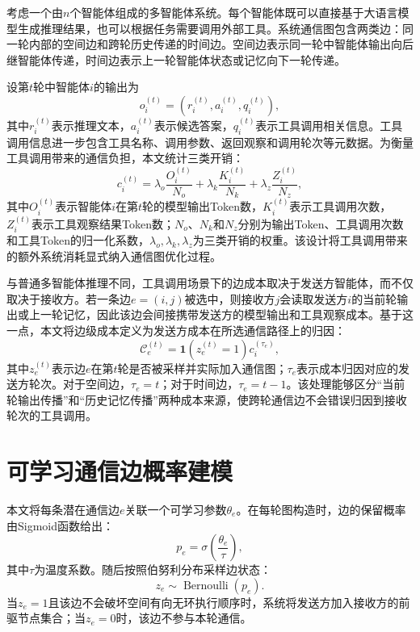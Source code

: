 考虑一个由$n$个智能体组成的多智能体系统。每个智能体既可以直接基于大语言模型生成推理结果，也可以根据任务需要调用外部工具。系统通信图包含两类边：同一轮内部的空间边和跨轮历史传递的时间边。空间边表示同一轮中智能体输出向后继智能体传递，时间边表示上一轮智能体状态或记忆向下一轮传递。

设第$t$轮中智能体$i$的输出为
\begin{equation}
  o_i^{(t)} = (r_i^{(t)}, a_i^{(t)}, q_i^{(t)}),
  \label{eq:tool-agent-output}
\end{equation}
其中$r_i^{(t)}$表示推理文本，$a_i^{(t)}$表示候选答案，$q_i^{(t)}$表示工具调用相关信息。工具调用信息进一步包含工具名称、调用参数、返回观察和调用轮次等元数据。为衡量工具调用带来的通信负担，本文统计三类开销：
\begin{equation}
  c_i^{(t)} = \lambda_o \frac{O_i^{(t)}}{N_o}
  + \lambda_k \frac{K_i^{(t)}}{N_k}
  + \lambda_z \frac{Z_i^{(t)}}{N_z},
  \label{eq:tool-cost}
\end{equation}
其中$O_i^{(t)}$表示智能体$i$在第$t$轮的模型输出Token数，$K_i^{(t)}$表示工具调用次数，$Z_i^{(t)}$表示工具观察结果Token数；$N_o$、$N_k$和$N_z$分别为输出Token、工具调用次数和工具Token的归一化系数，$\lambda_o,\lambda_k,\lambda_z$为三类开销的权重。该设计将工具调用带来的额外系统消耗显式纳入通信图优化过程。

与普通多智能体推理不同，工具调用场景下的边成本取决于发送方智能体，而不仅取决于接收方。若一条边$e=(i,j)$被选中，则接收方$j$会读取发送方$i$的当前轮输出或上一轮记忆，因此该边会间接携带发送方的模型输出和工具观察成本。基于这一点，本文将边级成本定义为发送方成本在所选通信路径上的归因：
\begin{equation}
  \mathcal{C}_e^{(t)} = \mathbf{1}(z_e^{(t)}=1)c_i^{(\tau_e)},
  \label{eq:edge-tool-cost}
\end{equation}
其中$z_e^{(t)}$表示边$e$在第$t$轮是否被采样并实际加入通信图；$\tau_e$表示成本归因对应的发送方轮次。对于空间边，$\tau_e=t$；对于时间边，$\tau_e=t-1$。该处理能够区分``当前轮输出传播''和``历史记忆传播''两种成本来源，使跨轮通信边不会错误归因到接收轮次的工具调用。

\section{可学习通信边概率建模}

本文将每条潜在通信边$e$关联一个可学习参数$\theta_e$。在每轮图构造时，边的保留概率由Sigmoid函数给出：
\begin{equation}
  p_e = \sigma\left(\frac{\theta_e}{\tau}\right),
  \label{eq:edge-probability}
\end{equation}
其中$\tau$为温度系数。随后按照伯努利分布采样边状态：
\begin{equation}
  z_e \sim \operatorname{Bernoulli}(p_e).
  \label{eq:edge-sampling}
\end{equation}
当$z_e=1$且该边不会破坏空间有向无环执行顺序时，系统将发送方加入接收方的前驱节点集合；当$z_e=0$时，该边不参与本轮通信。

